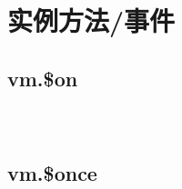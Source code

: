 \begin{lstlisting}[language=JavaScript]

\end{lstlisting}











\begin{lstlisting}[language=JavaScript]

\end{lstlisting}




\begin{lstlisting}[language=JavaScript]

\end{lstlisting}




\begin{lstlisting}[language=JavaScript]

\end{lstlisting}




\section{实例方法/事件}


\subsection{vm.\$on}








\begin{lstlisting}[language=JavaScript]

\end{lstlisting}




\begin{lstlisting}[language=JavaScript]

\end{lstlisting}




\begin{lstlisting}[language=JavaScript]

\end{lstlisting}



\subsection{vm.\$once}








